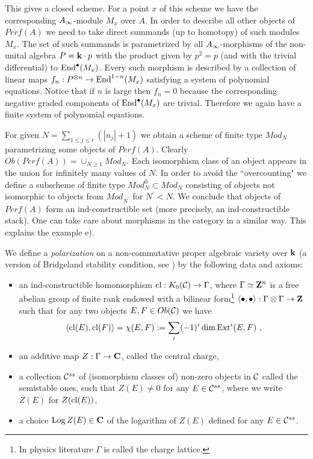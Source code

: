 \documentclass[12pt]{article}
\begin{document}
This gives a closed scheme. For a point $x$ of this scheme we have the corresponding $A_{\infty}$-module $M_x$ over $A$.  In order to describe all other objects of $Perf(A)$ we need to take direct summands (up to homotopy) of such modules $M_x$. The set of such summands is parametrized by all
$A_{\infty}$-morphisms of the non-unital algebra $P={\bf k}\cdot p$ with the product given by $p^2=p$  (and with the trivial differential) to $\operatorname{End}^\bullet(M_x)$.
Every such morphism is described by a collection of linear maps
$f_n: P^{\otimes n}\to \operatorname{End}^{1-n}(M_x)$ satisfying a system of polynomial equations. Notice that if $n$ is large then $f_n=0$ because the corresponding negative graded components of $\operatorname{End}^\bullet (M_x)$ are trivial.
Therefore we again have a finite system of polynomial equations.

For given $N=\sum_{1\le j\le r}(|n_j|+1)$ we obtain a scheme of finite type $Mod_N$ parametrizing some objects of $Perf(A)$. Clearly $Ob(Perf(A))=\cup_{N\geqslant 1}Mod_N$. Each isomorphism class of an object appears in the union for infinitely many values of $N$. In order to avoid the ``overcounting" we define a subscheme of finite type $Mod_N^0\subset Mod_N$ consisting of objects not isomorphic to objects from $Mod_{N^{\prime}}$ for $N^{\prime}<N$.
We conclude that objects of $Perf(A)$ form an ind-constructible set (more precisely, an ind-constructible stack). 
One can take care about morphisms in the category in a similar way. This explains the example e).

We define a {\it polarization} on a non-commutative proper algebraic variety over ${\bf k}$ (a version of Bridgeland stability condition, see \cite{Br1})
by the following data and axioms:

\begin{itemize}

\item{an ind-constructible homomorphism $\operatorname{cl}: K_0({\mathcal C})\to \Gamma$, where $\Gamma\simeq{\bf Z}^n$ is a free abelian group of finite rank endowed with a bilinear form\footnote{ In physics literature $\Gamma$ is called the charge lattice.} $\langle \bullet, \bullet\rangle:\Gamma\otimes \Gamma\to {\bf Z}$ such that for any two objects $E,F\in Ob({\mathcal C})$ we have $$\langle \operatorname{cl}(E), \operatorname{cl}(F)\rangle=\chi(E,F):=\sum_i(-1)^i\dim \operatorname{Ext}^i(E,F)\,\,,$$}
\item{an additive map $Z:\Gamma \to {\bf C}$, called the central charge,}
\item{a collection ${\mathcal C}^{ss}$ of (isomorphism classes of) non-zero objects in ${\mathcal C}$ called the
semistable ones, such that $Z(E)\ne 0$ for any $E\in
{\mathcal C}^{ss}$, where we write $Z(E)$ for $Z(\operatorname{cl}(E))$,}
\item{a choice $\operatorname{Log} Z(E) \in {\bf C}$ of the logarithm of $Z(E)$ defined for any $E\in {\mathcal C}^{ss}$.}
\end{itemize}
\end{document}
